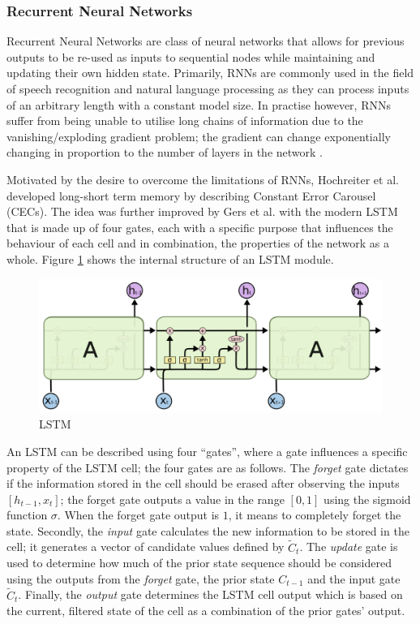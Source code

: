 \subsubsection{Recurrent Neural Networks}
Recurrent Neural Networks are class of neural networks that allows for previous outputs to be re-used as inputs to sequential nodes while maintaining and updating their own hidden state. Primarily, RNNs are commonly used in the field of speech recognition and natural language processing as they can process inputs of an arbitrary length with a constant model size. In practise however, RNNs suffer from being unable to utilise long chains of information due to the vanishing/exploding gradient problem; the gradient can change exponentially changing in proportion to the number of layers in the network \cite{Hochreiter:01book}.

Motivated by the desire to overcome the limitations of RNNs, Hochreiter et al. \cite{hochreiter1997long} developed long-short term memory by describing Constant Error Carousel (CECs). The idea was further improved by Gers et al. \cite{gers1999learning} with the modern LSTM that is made up of four gates, each with a specific purpose that influences the behaviour of each cell and in combination, the properties of the network as a whole. Figure \ref{fig:bg:lstm} shows the internal structure of an LSTM module.

\begin{figure}[ht]
  \centering
  \includegraphics[width=0.75\columnwidth]{sections/2background/images/lstm.png}
  \caption[Structure of an unrolled LSTM]{LSTM}
  \label{fig:bg:lstm}
\end{figure}

An LSTM can be described using four ``gates'', where a gate influences a specific property of the LSTM cell; the four gates are as follows. The \textit{forget} gate dictates if the information stored in the cell should be erased after observing the inputs $[h_{t-1}, x_t]$; the forget gate outputs a value in the range $[0, 1]$ using the sigmoid function $\sigma$. When the forget gate output is $1$, it means to completely forget the state. Secondly, the \textit{input} gate calculates the new information to be stored in the cell; it generates a vector of candidate values defined by $\tilde{C}_t$. The \textit{update} gate is used to determine how much of the prior state sequence should be considered using the outputs from the \textit{forget} gate, the prior state $C_{t-1}$ and the input gate $\tilde{C}_t$. Finally, the \textit{output} gate determines the LSTM cell output which is based on the current, filtered state of the cell as a combination of the prior gates' output.

